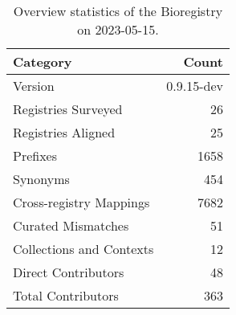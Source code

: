 \begin{table}
\caption{Overview statistics of the Bioregistry on 2023-05-15.}
\label{tab:bioregistry-summary}
\begin{tabular}{lr}
\toprule
Category & Count \\
\midrule
Version & 0.9.15-dev \\
Registries Surveyed & 26 \\
Registries Aligned & 25 \\
Prefixes & 1658 \\
Synonyms & 454 \\
Cross-registry Mappings & 7682 \\
Curated Mismatches & 51 \\
Collections and Contexts & 12 \\
Direct Contributors & 48 \\
Total Contributors & 363 \\
\bottomrule
\end{tabular}
\end{table}
